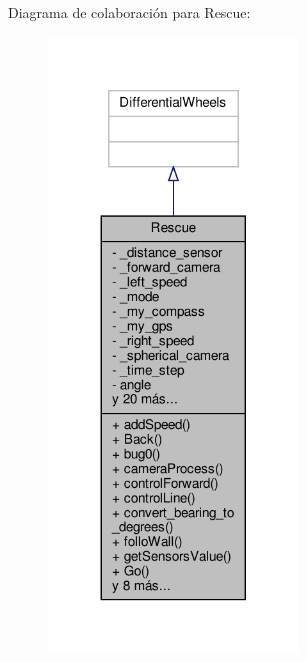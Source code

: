 Diagrama de colaboración para Rescue\+:\nopagebreak
\begin{figure}[H]
\begin{center}
\leavevmode
\includegraphics[width=188pt]{classRescue__coll__graph}
\end{center}
\end{figure}
